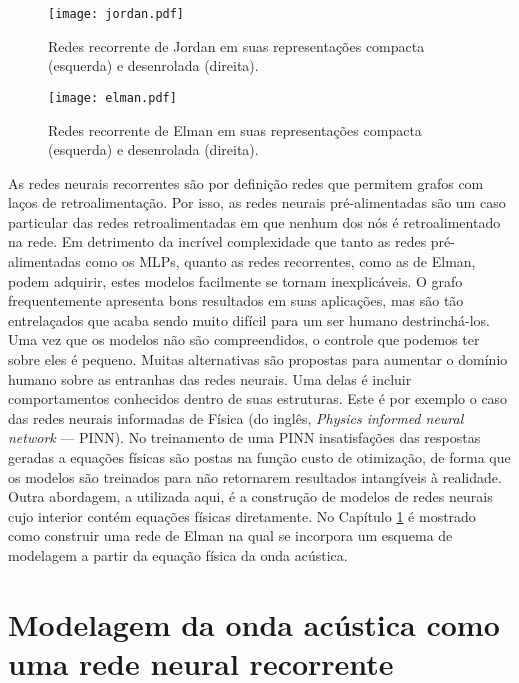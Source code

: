       \begin{figure}
        \begin{center}
          \texttt{[image: jordan.pdf]}
        \end{center}
        \caption{Redes recorrente de Jordan em suas representações compacta (esquerda) e desenrolada (direita).}
        \label{f:jordan}
      \end{figure}

      \begin{figure}
        \begin{center}
          \texttt{[image: elman.pdf]}
        \end{center}
        \caption{Redes recorrente de Elman em suas representações compacta (esquerda) e desenrolada (direita).}
        \label{f:elman}
      \end{figure}

      As redes neurais recorrentes são por definição redes que permitem grafos com laços de retroalimentação. Por isso, as redes neurais pré-alimentadas são um caso particular das redes retroalimentadas em que nenhum dos nós é retroalimentado na rede. Em detrimento da incrível complexidade que tanto as redes pré-alimentadas como os MLPs, quanto as redes recorrentes, como as de Elman, podem adquirir, estes modelos facilmente se tornam inexplicáveis. O grafo frequentemente apresenta bons resultados em suas aplicações, mas são tão entrelaçados que acaba sendo muito difícil para um ser humano destrinchá-los. Uma vez que os modelos não são compreendidos, o controle que podemos ter sobre eles é pequeno. Muitas alternativas são propostas para aumentar o domínio humano sobre as entranhas das redes neurais. Uma delas é incluir comportamentos conhecidos dentro de suas estruturas. Este é por exemplo o caso das redes neurais informadas de Física (do inglês, \textit{Physics informed neural network} --- PINN). No treinamento de uma PINN insatisfações das respostas geradas a equações físicas são postas na função custo de otimização, de forma que os modelos são treinados para não retornarem resultados intangíveis à realidade. Outra abordagem, a utilizada aqui, é a construção de modelos de redes neurais cujo interior contém equações físicas diretamente. No Capítulo \ref{c:modelagem_por_rnn} é mostrado como construir uma rede de Elman na qual se incorpora um esquema de modelagem a partir da equação física da onda acústica.


\chapter{Modelagem da onda acústica como uma rede neural recorrente} \label{c:modelagem_por_rnn}

